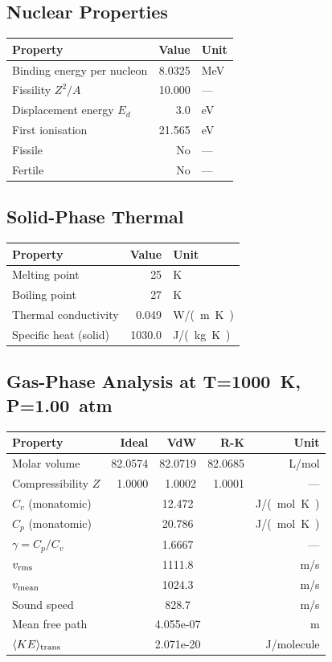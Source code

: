 \documentclass[11pt,a4paper]{article}
\begin{document}
\subsection{Nuclear Properties}
\begin{tabular}{lrl}
  \toprule
  Property & Value & Unit \\
  \midrule
  Binding energy per nucleon & 8.0325 & \si{MeV} \\
  Fissility $Z^2/A$ & 10.000 & --- \\
  Displacement energy $E_d$ & 3.0 & \si{eV} \\
  First ionisation & 21.565 & \si{eV} \\
  Fissile & No & --- \\
  Fertile & No & --- \\
  \bottomrule
\end{tabular}

\subsection{Solid-Phase Thermal}
\begin{tabular}{lrl}
  \toprule
  Property & Value & Unit \\
  \midrule
  Melting point & 25 & \si{K} \\
  Boiling point & 27 & \si{K} \\
  Thermal conductivity & 0.049 & \si{W/(m.K)} \\
  Specific heat (solid) & 1030.0 & \si{J/(kg.K)} \\
  \bottomrule
\end{tabular}

\subsection{Gas-Phase Analysis at T=\SI{1000}{K}, P=\SI{1.00}{atm}}
\begin{tabular}{lrrrr}
  \toprule
  Property & Ideal & VdW & R-K & Unit \\
  \midrule
  Molar volume & 82.0574 & 82.0719 & 82.0685 & \si{L/mol} \\
  Compressibility $Z$ & 1.0000 & 1.0002 & 1.0001 & --- \\
  \midrule
  $C_v$ (monatomic) & \multicolumn{3}{c}{12.472} & \si{J/(mol.K)} \\
  $C_p$ (monatomic) & \multicolumn{3}{c}{20.786} & \si{J/(mol.K)} \\
  $\gamma = C_p/C_v$ & \multicolumn{3}{c}{1.6667} & --- \\
  $v_{\rm rms}$ & \multicolumn{3}{c}{1111.8} & \si{m/s} \\
  $v_{\rm mean}$ & \multicolumn{3}{c}{1024.3} & \si{m/s} \\
  Sound speed & \multicolumn{3}{c}{828.7} & \si{m/s} \\
  Mean free path & \multicolumn{3}{c}{4.055e-07} & \si{m} \\
  $\langle KE \rangle_{\rm trans}$ & \multicolumn{3}{c}{2.071e-20} & \si{J/molecule} \\
  \bottomrule
\end{tabular}
\end{document}
